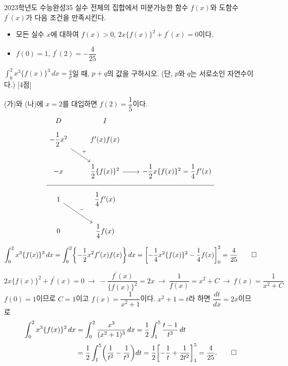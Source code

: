 \documentclass{article}
\begin{document}
\newpage
\begin{prob}{2023학년도 수능완성}{35}
	실수 전체의 집합에서 미분가능한 함수 $f(x)$와 도함수 $f^{\prime}(x)$가 다음 조건을 만족시킨다.
	\begin{hint}
		\begin{itemize}
			\item[(가)] 모든 실수 $x$에 대하여 $f(x)>0$, $2x\{f(x)\}^2+f^{\prime}(x)=0$이다.
			\item[(나)] $f(0)=1$, $f^{\prime}(2)=-\dfrac{4}{25}$
		\end{itemize}
	\end{hint}
	$\displaystyle\int_0^2x^3\{f(x)\}^3\,dx=\frac{q}{p}$일 때, $p+q$의 값을 구하시오. (단, $p$와 $q$는 서로소인 자연수이다.) [4점]
\end{prob}

\begin{sol}[풀이 1]
	(가)와 (나)에 $x=2$를 대입하면 $f(2)=\dfrac{1}{5}$이다.
	\[
		\begin{tikzcd}
			D & I & \\[-12pt]
			-\dfrac{1}{2}x^2 \arrow[rd, "+"] & f^\prime(x)f(x) & \\
			-x & \dfrac{1}{2}\{f(x)\}^2 \arrow[r] & -\dfrac{1}{2}x\{f(x)\}^2=\dfrac{1}{4}f^\prime(x) \\[-12pt] \hline \\[-12pt]
			1 \arrow[rd, "-"] & \dfrac{1}{4}f^\prime(x) & \\
			0 & \dfrac{1}{4}f(x) &
		\end{tikzcd}
	\]
	\[
		\int_0^2x^3\{f(x)\}^3\,dx=\int_0^2\biggl\{-\frac{1}{2}x^2f^{\prime}(x)f(x)\biggr\}\,dx=\biggl[-\frac{1}{4}x^2\{f(x)\}^2-\frac{1}{4}f(x)\biggr]_0^2=\frac{4}{25}\qed
	\]
\end{sol}

\begin{sol}[풀이 2]
	\[
		2x\{f(x)\}^2+f^{\prime}(x)=0~\longrightarrow~-\frac{f^{\prime}(x)}{\{f(x)\}^2}=2x~\longrightarrow~\frac{1}{f(x)}=x^2+C~\longrightarrow~f(x)=\frac{1}{x^2+C}
	\]
	$f(0)=1$이므로 $C=1$이고 $f(x)=\dfrac{1}{x^2+1}$이다. $x^2+1=t$라 하면 $\dfrac{dt}{dx}=2x$이므로
	\begin{align*}
		\int_0^2x^3\{f(x)\}^2\,dx&=\int_0^2\frac{x^3}{(x^2+1)^3}\,dx=\frac{1}{2}\int_1^5\frac{t-1}{t^3}\,dt\\[3pt]
		&=\frac{1}{2}\int_1^5\biggl(\frac{1}{t^2}-\frac{1}{t^3}\biggr)dt=\frac{1}{2}\biggl[-\frac{1}{t}+\frac{1}{2t^2}\biggr]_1^5=\frac{4}{25}.\qed
	\end{align*}
\end{sol}
\end{document}

